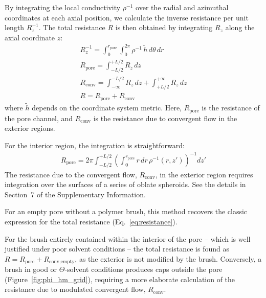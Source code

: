 \documentclass[12pt, a4paper]{article}
\begin{document}
By integrating the local conductivity $\rho^{-1}$ over the radial and azimuthal coordinates at each axial position, we calculate the inverse resistance per unit length $R_z^{-1}$.
The total resistance $R$ is then obtained by integrating $R_z$ along the axial coordinate $z$:
\begin{eqnarray}
    R_z^{-1} = \int_{0}^{r_{\text{pore}}}\int_{0}^{2\pi}\rho^{-1} \, \tilde{h} \, d\theta \, dr\\
    R_{\text{pore}} = \int_{-L/2}^{+L/2} R_z \, dz\\
    R_{\text{conv}} = \int_{-\infty}^{-L/2} R_z \, dz + \int_{+L/2}^{+\infty} R_z \, dz\\
    R = R_{\text{pore}} + R_{\text{conv}}
\end{eqnarray}
where $\tilde{h}$ depends on the coordinate system metric. Here, $R_{\textrm{pore}}$ is the resistance of the pore channel, and $R_{\textrm{conv}}$ is the resistance due to convergent flow in the exterior regions.


For the interior region, the integration is straightforward:
\begin{eqnarray}
    R_{\text{pore}} = 2\pi\int_{-L/2}^{+L/2}\left(\int_{0}^{r_{\text{pore}}} r \, dr \, \rho^{-1}(r, z')\right)^{-1} dz'
    \label{eq:R_pore}
\end{eqnarray}
The resistance due to the convergent flow, $R_{\text{conv}}$, in the exterior region requires integration over the surfaces of a series of oblate spheroids. 
See the details in Section~7 of the Supplementary Information.

For an empty pore without a polymer brush, this method recovers the classic expression for the total resistance (Eq.~\ref{eq:resistance}).

For the brush entirely contained within the interior of the pore -- which is well justified under poor solvent conditions -- the total resistance is found as $R = R_{\textrm{pore}} + R_{\textrm{conv,empty}}$, as the exterior is not modified by the brush.
Conversely, a brush in good or $\Theta$-solvent conditions produces caps outside the pore (Figure~\ref{fig:phi_hm_grid}), requiring a more elaborate calculation of the resistance due to modulated convergent flow, $R_{\textrm{conv}}$.
\end{document}
